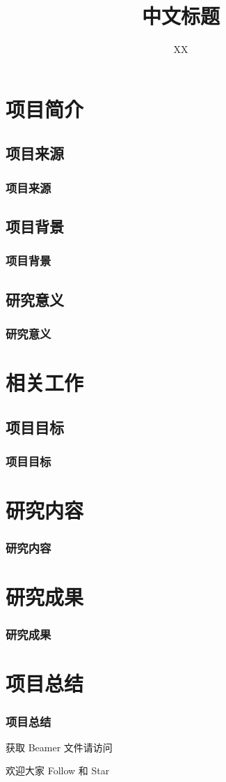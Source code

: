 \documentclass[aspectratio=169,12pt]{beamer}
\title{中文标题}
\author{XX}
\begin{document}
\maketitle
\makecontent

\section{项目简介}

\subsection{项目来源}
\begin{frame}
	\frametitle{项目来源}
\end{frame}

\subsection{项目背景}
\begin{frame}
	\frametitle{项目背景}
\end{frame}

\subsection{研究意义}
\begin{frame}
	\frametitle{研究意义}
\end{frame}

\section{相关工作}
\subsection{项目目标}
\begin{frame}
	\frametitle{项目目标}
\end{frame}

\section{研究内容}
\begin{frame}
	\frametitle{研究内容}
\end{frame}

\section{研究成果}
\begin{frame}
	\frametitle{研究成果}
\end{frame}

\section{项目总结}
\begin{frame}
	\frametitle{项目总结}
\end{frame}

\makebackcover

\begin{frame}
	
	\vspace{-5bp}
	\begin{flushleft}
	获取 Beamer 文件请访问 \href{https://github.com/Tang1705/BJTU-Beamer}{\faGithub}
	\newline

	欢迎大家 Follow 和 Star
	\end{flushleft}
\end{frame}
\end{document}
